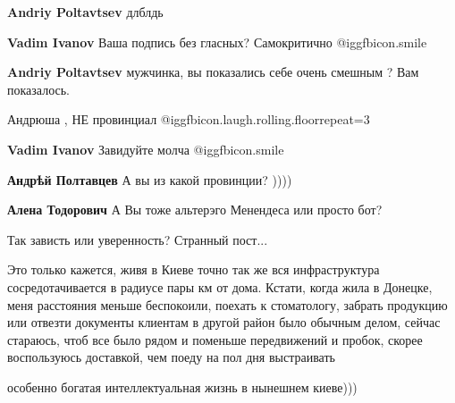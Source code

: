 \begin{itemize}
\begin{itemize}
\textbf{Andriy Poltavtsev} длблдь

\textbf{Vadim Ivanov} Ваша подпись без гласных? Самокритично  @igg{fbicon.smile} 

\textbf{Andriy Poltavtsev} мужчинка, вы показались себе очень смешным ? Вам показалось.

Андрюша , НЕ провинциал  @igg{fbicon.laugh.rolling.floor}{repeat=3} 

\textbf{Vadim Ivanov} Завидуйте молча  @igg{fbicon.smile} 

\textbf{Андрѣй Полтавцев} А вы из какой провинции? ))))

\textbf{Алена Тодорович} А Вы тоже альтерэго Менендеса или просто бот?
\end{itemize} %

Так зависть или уверенность? Странный пост...


Это только кажется, живя в Киеве точно так же вся инфраструктура
сосредотачивается в радиусе пары км от дома. Кстати, когда жила в Донецке, меня
расстояния меньше беспокоили, поехать к стоматологу, забрать продукцию или
отвезти документы клиентам в другой район было обычным делом, сейчас стараюсь,
чтоб все было рядом и поменьше передвижений и пробок, скорее воспользуюсь
доставкой, чем поеду на пол дня выстраивать

особенно богатая интеллектуальная жизнь в нынешнем киеве)))

\end{itemize} %
